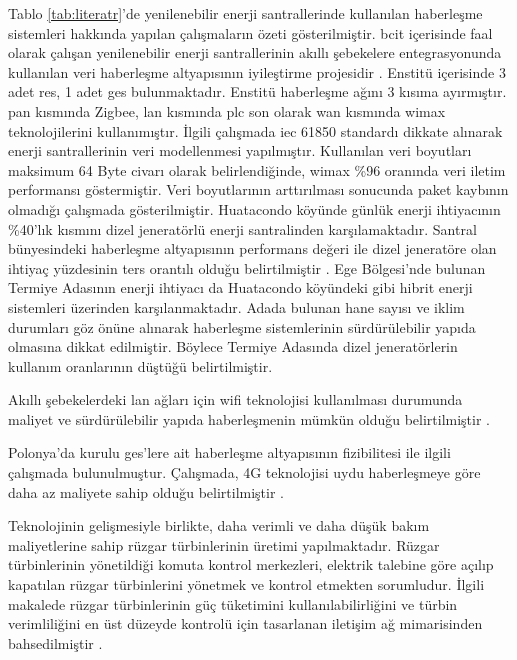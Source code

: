 Tablo \ref{tab:literatr}'de yenilenebilir enerji santrallerinde kullanılan haberleşme sistemleri hakkında yapılan çalışmaların özeti gösterilmiştir. \gls{bcit} içerisinde faal olarak çalışan yenilenebilir enerji santrallerinin akıllı şebekelere entegrasyonunda kullanılan veri haberleşme altyapısının iyileştirme projesidir \cite{BCIT}. Enstitü içerisinde 3 adet \gls{res}, 1 adet \gls{ges} bulunmaktadır. Enstitü haberleşme ağını 3 kısıma ayırmıştır. \gls{pan} kısmında Zigbee, \gls{lan} kısmında \gls{plc} son olarak \gls{wan} kısmında \gls{wimax} teknolojilerini kullanımıştır. İlgili çalışmada \gls{iec} 61850 standardı dikkate alınarak enerji santrallerinin veri modellenmesi yapılmıştır. Kullanılan veri boyutları maksimum 64 Byte civarı olarak belirlendiğinde, \gls{wimax} \%96 oranında veri iletim performansı göstermiştir. Veri boyutlarının arttırılması sonucunda paket kaybının olmadığı çalışmada gösterilmiştir. Huatacondo köyünde günlük enerji ihtiyacının \%40'lık kısmını dizel jeneratörlü enerji santralinden karşılamaktadır. Santral bünyesindeki haberleşme altyapısının performans değeri ile dizel jeneratöre olan ihtiyaç yüzdesinin ters orantılı olduğu belirtilmiştir \cite{microgrid_siliOrnek}. Ege Bölgesi'nde bulunan Termiye Adasının enerji ihtiyacı da Huatacondo köyündeki gibi hibrit enerji sistemleri üzerinden karşılanmaktadır. Adada bulunan hane sayısı ve iklim durumları göz önüne alınarak haberleşme sistemlerinin sürdürülebilir yapıda olmasına dikkat edilmiştir. Böylece Termiye Adasında dizel jeneratörlerin kullanım oranlarının düştüğü belirtilmiştir\cite{yunanOrnek}.

Akıllı şebekelerdeki \gls{lan} ağları için \gls{wifi} teknolojisi kullanılması durumunda maliyet ve sürdürülebilir yapıda haberleşmenin mümkün olduğu belirtilmiştir \cite{5779257}.

Polonya'da kurulu \gls{ges}'lere ait haberleşme altyapısının fizibilitesi ile ilgili çalışmada bulunulmuştur. Çalışmada, 4G teknolojisi uydu haberleşmeye göre daha az maliyete sahip olduğu belirtilmiştir \cite{TbarMartnez2021PositiveEO}.


Teknolojinin gelişmesiyle birlikte, daha verimli ve daha düşük bakım maliyetlerine sahip rüzgar türbinlerinin üretimi yapılmaktadır. Rüzgar türbinlerinin yönetildiği komuta kontrol merkezleri, elektrik talebine göre açılıp kapatılan rüzgar türbinlerini yönetmek ve kontrol etmekten sorumludur. İlgili makalede rüzgar türbinlerinin güç tüketimini kullanılabilirliğini ve türbin verimliliğini en üst düzeyde kontrolü için tasarlanan iletişim ağ mimarisinden bahsedilmiştir \cite{ahmed2014communication}.

